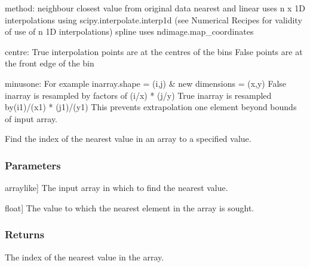 \documentclass[letterpaper,10pt,english]{sphinxmanual}
\begin{document}
\begin{fulllineitems}
\sphinxAtStartPar
method:
neighbour \sphinxhyphen{} closest value from original data
nearest and linear \sphinxhyphen{} uses n x 1\sphinxhyphen{}D interpolations using scipy.interpolate.interp1d (see Numerical Recipes for validity of use of n 1\sphinxhyphen{}D interpolations)
spline \sphinxhyphen{} uses ndimage.map\_coordinates

\sphinxAtStartPar
centre:
True \sphinxhyphen{} interpolation points are at the centres of the bins
False \sphinxhyphen{} points are at the front edge of the bin

\sphinxAtStartPar
minusone:
For example\sphinxhyphen{} inarray.shape = (i,j) \& new dimensions = (x,y)
False \sphinxhyphen{} inarray is resampled by factors of (i/x) * (j/y)
True \sphinxhyphen{} inarray is resampled by(i\sphinxhyphen{}1)/(x\sphinxhyphen{}1) * (j\sphinxhyphen{}1)/(y\sphinxhyphen{}1)
This prevents extrapolation one element beyond bounds of input array.

\end{fulllineitems}


\begin{fulllineitems}
\label{\detokenize{pycatch/utils/extensions:pycatch.utils.extensions.find_nearest}}
\pysigstartsignatures
{}
\pysigstopsignatures
\sphinxAtStartPar
Find the index of the nearest value in an array to a specified value.


\subsubsection{Parameters}
\label{\detokenize{pycatch/utils/extensions:id1}}\begin{description}
\sphinxlineitem{array}{[}array\sphinxhyphen{}like{]}
\sphinxAtStartPar
The input array in which to find the nearest value.

\sphinxlineitem{value}{[}float{]}
\sphinxAtStartPar
The value to which the nearest element in the array is sought.

\end{description}


\subsubsection{Returns}
\label{\detokenize{pycatch/utils/extensions:id2}}\begin{description}
\sphinxAtStartPar
The index of the nearest value in the array.

\end{description}

\end{fulllineitems}
\end{document}
